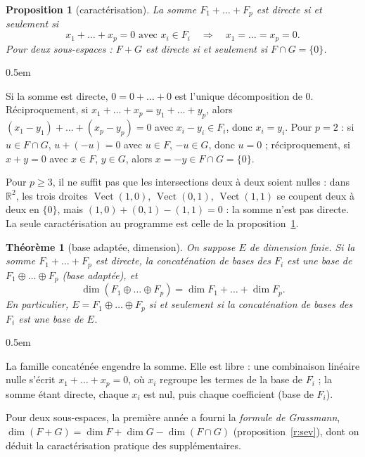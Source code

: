 \documentclass[a4paper,11pt]{article}
\makeatletter
\numberwithin{equation}{section}
\numberwithin{figure}{section}
\numberwithin{table}{section}
\theoremstyle{enonce}
\newtheorem{theoreme}[definition]{Théorème}
\newtheorem{proposition}[definition]{Proposition}
\theoremstyle{exemple}
\theoremstyle{remarque}
\renewcommand{\proofname}{Démonstration}
\renewenvironment{proof}[1][\proofname]{\par\pushQED{\qed}\normalfont
  \topsep0.5em\relax\trivlist\item[\hskip\labelsep\sffamily\itshape\color{Gris}#1.]\ignorespaces}
  {\popQED\endtrivlist\@endpefalse}
\newcommand{\R}{\mathbb{R}}
\newcommand{\vect}{\operatorname{Vect}}
\makeatother
\begin{document}
\begin{proposition}[caractérisation]\label{p:directe}
La somme $F_1+\dots+F_p$ est directe si et seulement si
\[x_1+\dots+x_p=0\text{ avec }x_i\in F_i\quad\Longrightarrow\quad x_1=\dots=x_p=0.\]
Pour deux sous-espaces : $F+G$ est directe si et seulement si $F\cap G=\{0\}$.
\end{proposition}

\begin{proof}
Si la somme est directe, $0=0+\dots+0$ est l'unique décomposition de $0$. Réciproquement, si $x_1+\dots+x_p=y_1+\dots+y_p$,
alors $(x_1-y_1)+\dots+(x_p-y_p)=0$ avec $x_i-y_i\in F_i$, donc $x_i=y_i$. Pour $p=2$ : si $u\in F\cap G$, $u+(-u)=0$ avec
$u\in F$, $-u\in G$, donc $u=0$ ; réciproquement, si $x+y=0$ avec $x\in F$, $y\in G$, alors $x=-y\in F\cap G=\{0\}$.
\end{proof}

\begin{attention}
Pour $p\geq3$, il ne suffit pas que les intersections deux à deux soient nulles : dans $\R^2$, les trois droites
$\vect(1,0)$, $\vect(0,1)$, $\vect(1,1)$ se coupent deux à deux en $\{0\}$, mais $(1,0)+(0,1)-(1,1)=0$ : la somme n'est pas directe.
La seule caractérisation au programme est celle de la proposition~\ref{p:directe}.
\end{attention}

\begin{theoreme}[base adaptée, dimension]\label{t:adaptee}
On suppose $E$ de dimension finie. Si la somme $F_1+\dots+F_p$ est directe, la concaténation de bases des $F_i$ est une base
de $F_1\oplus\dots\oplus F_p$ (base \emph{adaptée}), et
\[\dim(F_1\oplus\dots\oplus F_p)=\dim F_1+\dots+\dim F_p.\]
En particulier, $E=F_1\oplus\dots\oplus F_p$ si et seulement si la concaténation de bases des $F_i$ est une base de $E$.
\end{theoreme}

\begin{proof}
La famille concaténée engendre la somme. Elle est libre : une combinaison linéaire nulle s'écrit $x_1+\dots+x_p=0$, où $x_i$
regroupe les termes de la base de $F_i$ ; la somme étant directe, chaque $x_i$ est nul, puis chaque coefficient (base de $F_i$).
\end{proof}

Pour deux sous-espaces, la première année a fourni la \emph{formule de Grassmann}, $\dim(F+G)=\dim F+\dim G-\dim(F\cap G)$
(proposition~\ref{r:sev}), dont on déduit la caractérisation pratique des supplémentaires.
\end{document}
